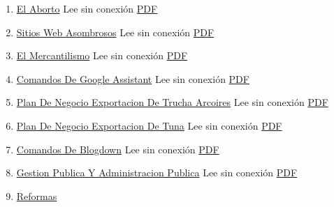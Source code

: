 \documentclass[
  jou,
  floatsintext,
  longtable,
  a4paper,
  nolmodern,
  notxfonts,
  notimes,
  colorlinks=true,linkcolor=blue,citecolor=blue,urlcolor=blue]{apa7}
\providecommand{\tightlist}{%
  \setlength{\itemsep}{0pt}\setlength{\parskip}{0pt}}
\begin{document}
\begin{enumerate}
\def\labelenumi{\arabic{enumi}.}
\tightlist
\item
  \href{https://achalmaedison.netlify.app/blog/posts/2015-05-14-el-aborto}{El
  Aborto} Lee sin conexión
  \href{https://achalmaedison.netlify.app/blog/posts/2015-05-14-el-aborto/index.pdf}{PDF}
\item
  \href{https://achalmaedison.netlify.app/blog/posts/2017-04-23-sitios-web-asombrosos}{Sitios
  Web Asombrosos} Lee sin conexión
  \href{https://achalmaedison.netlify.app/blog/posts/2017-04-23-sitios-web-asombrosos/index.pdf}{PDF}
\item
  \href{https://achalmaedison.netlify.app/blog/posts/2017-05-23-el-mercantilismo}{El
  Mercantilismo} Lee sin conexión
  \href{https://achalmaedison.netlify.app/blog/posts/2017-05-23-el-mercantilismo/index.pdf}{PDF}
\item
  \href{https://achalmaedison.netlify.app/blog/posts/2020-05-23-comandos-de-google-assistant}{Comandos
  De Google Assistant} Lee sin conexión
  \href{https://achalmaedison.netlify.app/blog/posts/2020-05-23-comandos-de-google-assistant/index.pdf}{PDF}
\item
  \href{https://achalmaedison.netlify.app/blog/posts/2020-09-15-plan-de-negocio-exportacion-de-trucha-arcoires}{Plan
  De Negocio Exportacion De Trucha Arcoires} Lee sin conexión
  \href{https://achalmaedison.netlify.app/blog/posts/2020-09-15-plan-de-negocio-exportacion-de-trucha-arcoires/index.pdf}{PDF}
\item
  \href{https://achalmaedison.netlify.app/blog/posts/2021-07-13-plan-de-negocio-exportacion-de-tuna}{Plan
  De Negocio Exportacion De Tuna} Lee sin conexión
  \href{https://achalmaedison.netlify.app/blog/posts/2021-07-13-plan-de-negocio-exportacion-de-tuna/index.pdf}{PDF}
\item
  \href{https://achalmaedison.netlify.app/blog/posts/2021-07-14-comandos-de-blogdown}{Comandos
  De Blogdown} Lee sin conexión
  \href{https://achalmaedison.netlify.app/blog/posts/2021-07-14-comandos-de-blogdown/index.pdf}{PDF}
\item
  \href{https://achalmaedison.netlify.app/blog/posts/2021-10-01-gestion-publica-y-administracion-publica}{Gestion
  Publica Y Administracion Publica} Lee sin conexión
  \href{https://achalmaedison.netlify.app/blog/posts/2021-10-01-gestion-publica-y-administracion-publica/index.pdf}{PDF}
\item
  \href{https://achalmaedison.netlify.app/blog/posts/2021-10-01-reformas-y-modernizacion-de-la-gestion-publica}{Reformas
}
\end{enumerate}
\end{document}

